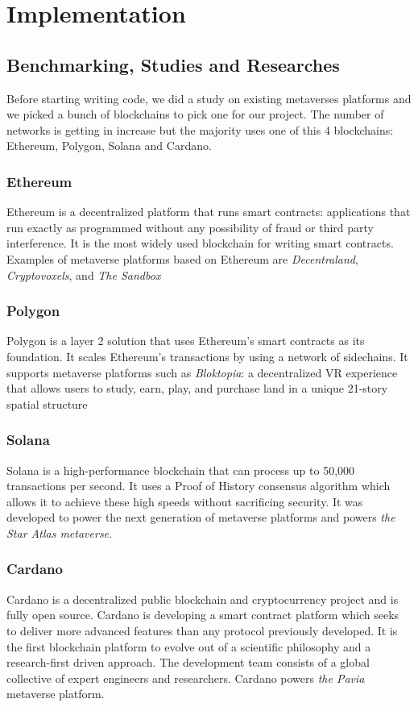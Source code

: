 \chapter{Implementation}

 
\section{Benchmarking, Studies and Researches}
Before starting writing code, we did a study on existing metaverses platforms and we picked a bunch of blockchains to pick one for our project. The number of networks is getting in increase but the majority uses one of this 4 blockchains: Ethereum, Polygon, Solana and Cardano.

\subsection{Ethereum}
Ethereum is a decentralized platform that runs smart contracts: applications that run exactly as programmed without any possibility of fraud or third party interference. It is the most widely used blockchain for writing smart contracts. Examples of metaverse platforms based on Ethereum are \textit{Decentraland}, \textit{Cryptovoxels}, and \textit{The Sandbox}

\subsection{Polygon}
Polygon is a layer 2 solution that uses Ethereum’s smart contracts as its foundation. It scales Ethereum’s transactions by using a network of sidechains. It supports metaverse platforms such as \textit{Bloktopia}: a
decentralized VR experience that allows users to study, earn,
play, and purchase land in a unique 21-story spatial structure

\subsection{Solana}
Solana is a high-performance blockchain that can process up to 50,000 transactions per second. It uses a Proof of History consensus algorithm which allows it to achieve these high speeds without sacrificing security. It was developed to power the next generation of
metaverse platforms and powers \textit{the Star Atlas metaverse}.

\subsection{Cardano}
Cardano is a decentralized public blockchain and cryptocurrency project and is fully open source. Cardano is developing a smart contract platform which seeks to deliver more advanced features than any protocol previously developed. It is the first blockchain platform to evolve out of a scientific philosophy and a research-first driven approach. The development team consists of a global collective of expert engineers and researchers. Cardano powers \textit{the Pavia} metaverse platform.
\bigskip

